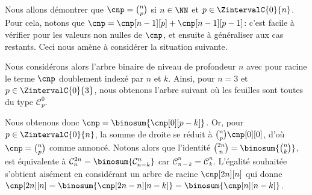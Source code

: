 Nous allons démontrer que $\cnp = \binom{n}{p}$ si $n \in \NN$ et $p \in \ZintervalC{0}{n}$.
%
Pour cela, notons que $\cnp = \cnp[n-1][p] + \cnp[n-1][p-1]$:
c'est facile à vérifier pour les valeurs non nulles de $\cnp$, et ensuite à généraliser aux cas restants.
Ceci nous amène à considérer la situation suivante.

\explaintree{\cnp}{\cnp[n-1][p]}{\cnp[n-1][p-1]}%
            {\factobinomintertree}{}

Nous considérons alors l'arbre binaire de niveau de profondeur $n$ avec pour racine le terme $\cnp$ doublement indexé par $n$ et $k$.
Ainsi, pour $n=3$ et $p \in \ZintervalC{0}{3}$, nous obtenons l'arbre suivant où les feuilles sont toutes du type $\mathcal{C}^0_p$.


Nous obtenons donc
$\cnp = \binosum{\cnp[0][p-k]}$.
Or, pour $p \in \ZintervalC{0}{n}$, la somme de droite se réduit à $\binom{n}{p} \cnp[0][0]$, d'où $\cnp = \binom{n}{p}$ comme annoncé.
%
Notons alors que l'identité
$\binom{2n}{n} = \binosum{\binom{n}{k}}$,
est équivalente à
$\mathcal{C}^{2n}_n = \binosum{\mathcal{C}^n_{n-k}}$ car $\mathcal{C}^n_{n-k} = \mathcal{C}^n_k$.
%
L'égalité souhaitée s'obtient aisément en considérant un arbre de racine $\cnp[2n][n]$ qui donne
$\cnp[2n][n] = \binosum{\cnp[2n - n][n-k]} = \binosum{\cnp[n][n-k]}$.
